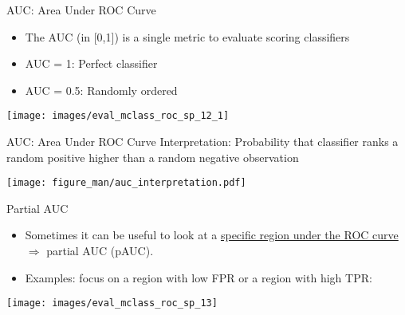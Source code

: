 \documentclass[11pt,compress,t,notes=noshow, xcolor=table]{beamer}
\newenvironment{knitrout}{}{} %
\begin{document}
\begin{vbframe}{AUC: Area Under ROC Curve}

\begin{itemize}
  \item The AUC (in [0,1]) is a single metric to evaluate scoring classifiers
  \item AUC = 1: Perfect classifier
  \item AUC = 0.5: Randomly ordered
\end{itemize}
\begin{knitrout}\scriptsize
{}\color{fgcolor}

{\centering \texttt{[image: images/eval\_mclass\_roc\_sp\_12\_1]} 

}



\end{knitrout}
\end{vbframe}


\begin{vbframe}{AUC: Area Under ROC Curve}
Interpretation: Probability that classifier ranks a random positive higher than a random negative observation

\begin{center}
\texttt{[image: figure\_man/auc\_interpretation.pdf]}
\end{center}

\end{vbframe}


\begin{vbframe}{Partial AUC}
\begin{itemize}
  \item Sometimes it can be useful to look at a \href{http://journals.sagepub.com/doi/pdf/10.1177/0272989X8900900307}{specific region under the ROC curve}  $\Rightarrow$ partial AUC (pAUC).
  \item Examples: focus on a region with low FPR or a region with high TPR:
\end{itemize}

\begin{knitrout}\scriptsize
{}\color{fgcolor}

{\centering \texttt{[image: images/eval\_mclass\_roc\_sp\_13]} 

}



\end{knitrout}

\end{vbframe}




\endlecture
\end{document}
